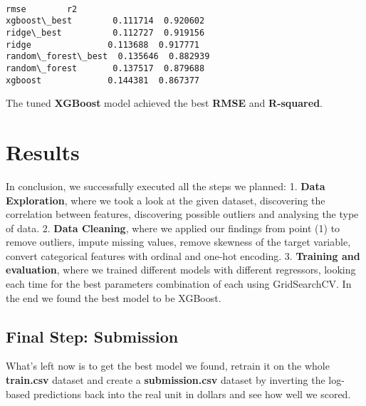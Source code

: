 \documentclass[11pt]{article}
\makeatletter
\newcommand{\boxspacing}{\kern\kvtcb@left@rule\kern\kvtcb@boxsep}
\newcommand{\prompt}[4]{
        {\ttfamily\llap{{\color{#2}[#3]:\hspace{3pt}#4}}\vspace{-\baselineskip}}
    }
\makeatother
\begin{document}
    \begin{center}
    \end{center}
    { \hspace*{\fill} \\}
    
            \begin{tcolorbox}[breakable, size=fbox, boxrule=.5pt, pad at break*=1mm, opacityfill=0]
\prompt{Out}{outcolor}{34}{\boxspacing}
\begin{Verbatim}[commandchars=\\\{\}]
                        rmse        r2
xgboost\_best        0.111714  0.920602
ridge\_best          0.112727  0.919156
ridge               0.113688  0.917771
random\_forest\_best  0.135646  0.882939
random\_forest       0.137517  0.879688
xgboost             0.144381  0.867377
\end{Verbatim}
\end{tcolorbox}
        
    The tuned \textbf{XGBoost} model achieved the best \textbf{RMSE} and
\textbf{R-squared}.

    \section{Results}\label{results}

    In conclusion, we successfully executed all the steps we planned: 1.
\textbf{Data Exploration}, where we took a look at the given dataset,
discovering the correlation between features, discovering possible
outliers and analysing the type of data. 2. \textbf{Data Cleaning},
where we applied our findings from point (1) to remove outliers, impute
missing values, remove skewness of the target variable, convert
categorical features with ordinal and one-hot encoding. 3.
\textbf{Training and evaluation}, where we trained different models with
different regressors, looking each time for the best parameters
combination of each using GridSearchCV. In the end we found the best
model to be XGBoost.

    \subsection{Final Step: Submission}\label{final-step-submission}

What's left now is to get the best model we found, retrain it on the
whole \textbf{train.csv} dataset and create a \textbf{submission.csv}
dataset by inverting the log-based predictions back into the real unit
in dollars and see how well we scored.
\end{document}
